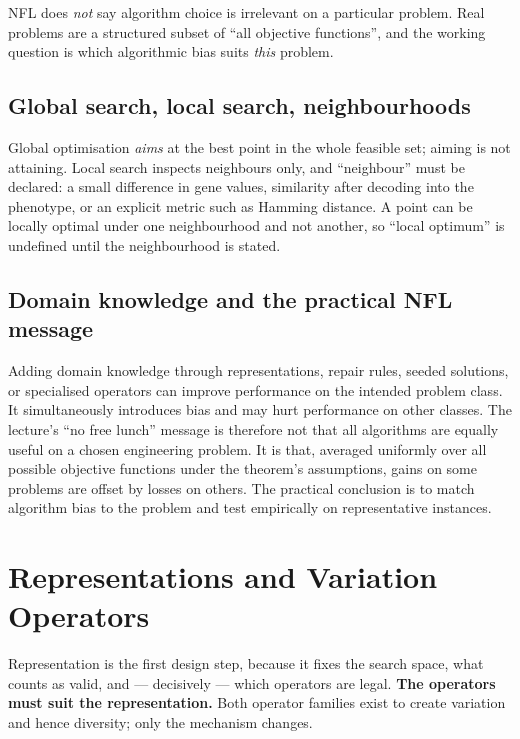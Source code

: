 \documentclass[11pt,a4paper]{article}
\begin{document}
NFL does \emph{not} say algorithm choice is irrelevant on a particular
problem. Real problems are a structured subset of ``all objective
functions'', and the working question is which algorithmic bias suits
\emph{this} problem.

\subsection{Global search, local search, neighbourhoods}

Global optimisation \emph{aims} at the best point in the whole feasible set;
aiming is not attaining. Local search inspects neighbours only, and
``neighbour'' must be declared: a small difference in gene values, similarity
after decoding into the phenotype, or an explicit metric such as Hamming
distance. A point can be locally optimal under one neighbourhood and not
another, so ``local optimum'' is undefined until the neighbourhood is stated.


\subsection{Domain knowledge and the practical NFL message}

Adding domain knowledge through representations, repair rules, seeded
solutions, or specialised operators can improve performance on the intended
problem class.  It simultaneously introduces bias and may hurt performance on
other classes.  The lecture's ``no free lunch'' message is therefore not that
all algorithms are equally useful on a chosen engineering problem.  It is
that, averaged uniformly over all possible objective functions under the
theorem's assumptions, gains on some problems are offset by losses on others.
The practical conclusion is to match algorithm bias to the problem and test
empirically on representative instances.

\section{Representations and Variation Operators}

Representation is the first design step, because it fixes the search space,
what counts as valid, and --- decisively --- which operators are legal.
\textbf{The operators must suit the representation.} Both operator families
exist to create variation and hence diversity; only the mechanism changes.
\end{document}
